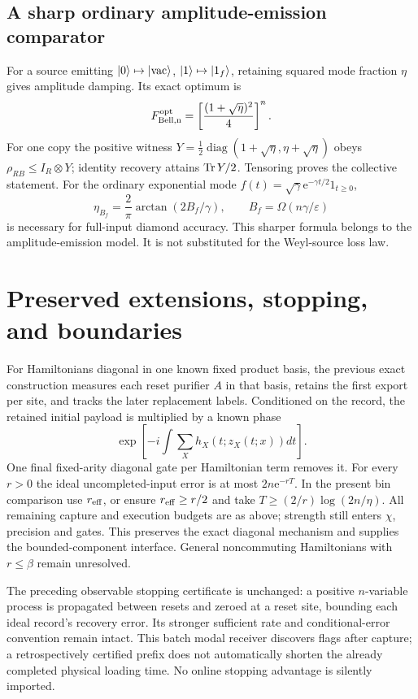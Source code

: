 \documentclass[11pt,a4paper]{article}
\newcommand{\ee}{\mathrm e}
\begin{document}
\subsection{A sharp ordinary amplitude-emission comparator}

For a source emitting $\lvert 0\rangle\mapsto\lvert \mathrm{vac}\rangle$, $\lvert 1\rangle\mapsto\lvert 1_f\rangle$, retaining squared mode fraction $\eta$ gives amplitude damping. Its exact optimum is
\begin{equation}
 F_{\rm Bell,n}^{\rm opt}=\left[\frac{(1+\sqrt\eta)^2}{4}\right]^n.
\end{equation}
For one copy the positive witness $Y=\tfrac12\operatorname{diag}(1+\sqrt\eta,\eta+\sqrt\eta)$ obeys $\rho_{RB}\le I_R\otimes Y$; identity recovery attains $\operatorname{Tr} Y/2$. Tensoring proves the collective statement. For the ordinary exponential mode $f(t)=\sqrt\gamma\ee^{-\gamma t/2}1_{t\ge0}$,
\begin{equation}
 \eta_{B_f}=\frac2\pi\arctan(2B_f/\gamma),
 \qquad B_f=\Omega(n\gamma/\varepsilon)
\end{equation}
is necessary for full-input diamond accuracy. This sharper formula belongs to the amplitude-emission model. It is not substituted for the Weyl-source loss law.

\section{Preserved extensions, stopping, and boundaries}

For Hamiltonians diagonal in one known fixed product basis, the previous exact construction measures each reset purifier $A$ in that basis, retains the first export per site, and tracks the later replacement labels. Conditioned on the record, the retained initial payload is multiplied by a known phase
\begin{equation}
 \exp\!\left[-i\int\sum_X h_X(t;z_X(t;x))dt\right].
\end{equation}
One final fixed-arity diagonal gate per Hamiltonian term removes it. For every $r>0$ the ideal uncompleted-input error is at most $2n\ee^{-rT}$. In the present bin comparison use $r_{\rm eff}$, or ensure $r_{\rm eff}\ge r/2$ and take $T\ge(2/r)\log(2n/\eta)$. All remaining capture and execution budgets are as above; strength still enters $\chi$, precision and gates. This preserves the exact diagonal mechanism and supplies the bounded-component interface. General noncommuting Hamiltonians with $r\le\beta$ remain unresolved.

The preceding observable stopping certificate is unchanged: a positive $n$-variable process is propagated between resets and zeroed at a reset site, bounding each ideal record's recovery error. Its stronger sufficient rate and conditional-error convention remain intact. This batch modal receiver discovers flags after capture; a retrospectively certified prefix does not automatically shorten the already completed physical loading time. No online stopping advantage is silently imported.
\end{document}

